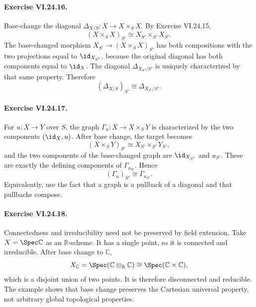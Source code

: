 \paragraph{Exercise VI.24.16.}
\begin{solution}
Base-change the diagonal $\Delta_{X/S}:X\to X\times_SX$.  By Exercise VI.24.15,
\[
(X\times_SX)_{S'}\cong X_{S'}\times_{S'}X_{S'}.
\]
The base-changed morphism $X_{S'}\to(X\times_SX)_{S'}$ has both compositions with the two
projections equal to $\id_{X_{S'}}$, because the original diagonal has both components equal to
$\id_X$.  The diagonal $\Delta_{X_{S'}/S'}$ is uniquely characterized by that same property.
Therefore
\[
(\Delta_{X/S})_{S'}\cong\Delta_{X_{S'}/S'}.
\]
\end{solution}

\paragraph{Exercise VI.24.17.}
\begin{solution}
For $u:X\to Y$ over $S$, the graph $\Gamma_u:X\to X\times_SY$ is characterized by the two
components $(\id_X,u)$.  After base change, the target becomes
\[
(X\times_SY)_{S'}\cong X_{S'}\times_{S'}Y_{S'},
\]
and the two components of the base-changed graph are $\id_{X_{S'}}$ and $u_{S'}$.  These are
exactly the defining components of $\Gamma_{u_{S'}}$.  Hence
\[
(\Gamma_u)_{S'}\cong\Gamma_{u_{S'}}.
\]
Equivalently, use the fact that a graph is a pullback of a diagonal and that pullbacks compose.
\end{solution}

\paragraph{Exercise VI.24.18.}
\begin{solution}
Connectedness and irreducibility need not be preserved by field extension.  Take
$X=\Spec\mathbb C$ as an $\mathbb R$-scheme.  It has a single point, so it is connected and
irreducible.  After base change to $\mathbb C$,
\[
X_{\mathbb C}=\Spec(\mathbb C\otimes_{\mathbb R}\mathbb C)
\cong\Spec(\mathbb C\times\mathbb C),
\]
which is a disjoint union of two points.  It is therefore disconnected and reducible.  The
example shows that base change preserves the Cartesian universal property, not arbitrary global
topological properties.
\end{solution}

